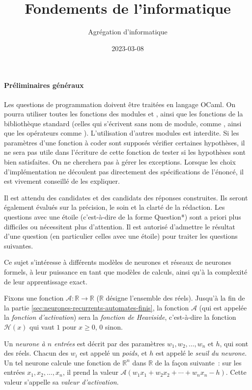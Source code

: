 \documentclass[10pt]{article}
\title{Fondements de l'informatique}
\author{Agrégation d'informatique}
\date{2023-03-08}
\begin{document}
\maketitle

\paragraph{Préliminaires généraux} Les questions de programmation doivent être traitées en langage OCaml. On pourra utiliser toutes les fonctions des modules  et , ainsi que les fonctions de la bibliothèque standard (celles qui s'écrivent sans nom de module, comme ,  ainsi que les opérateurs comme ). L'utilisation d'autres modules est interdite. Si les paramètres d'une fonction à coder sont supposés vérifier certaines hypothèses, il ne sera pas utile dans l'écriture de cette fonction de tester si les hypothèses sont bien satisfaites. On ne cherchera pas à gérer les exceptions. Lorsque les choix d'implémentation ne découlent pas directement des spécifications de l'énoncé, il est vivement conseillé de les expliquer.

Il est attendu des candidates et des candidats des réponses construites. Ils seront également évalués sur la précision, le soin et la clarté de la rédaction. Les questions avec une étoile (c'est-à-dire de la forme Question*) sont a priori plus difficiles ou nécessitent plus d'attention. Il est autorisé d'admettre le résultat d'une question (en particulier celles avec une étoile) pour traiter les questions suivantes.

Ce sujet s'intéresse à différents modèles de neurones et réseaux de neurones formels, à leur puissance en tant que modèles de calculs, ainsi qu'à la complexité de leur apprentissage exact.

Fixons une fonction $\mathcal{A}: ℝ → ℝ$ ($ℝ$ désigne l'ensemble des réels). Jusqu'à la fin de la partie \ref{sec:neurones-recurrents-automates-finis}, la fonction $\mathcal{A}$ (qui est appelée la \emph{fonction d'activation}) sera la \emph{fonction de Heaviside}, c'est-à-dire la fonction $\mathcal{H}(x)$ qui vaut $1$ pour $x ≥ 0$, $0$ sinon.

Un \emph{neurone à $n$ entrées} est décrit par des paramètres $w_{1}, w_{2}, \ldots, w_{n}$ et $h$, qui sont des réels. Chacun des $w_{i}$ est appelé un \emph{poids}, et $h$ est appelé le \emph{seuil du neurone}. Un tel neurone calcule une fonction de $ℝ^{n}$ dans $ℝ$ de la façon suivante : sur les entrées $x_{1}, x_{2}, \ldots, x_{n}$, il prend la valeur $\mathcal{A}\left(w_{1} x_{1}+w_{2} x_{2}+\cdots+w_{n} x_{n}-h\right)$. Cette valeur s'appelle sa \emph{valeur d'activation}.
\end{document}
